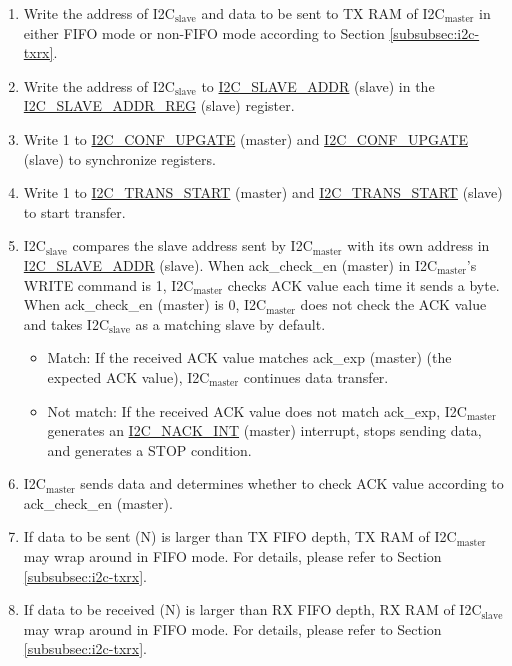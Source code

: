\documentclass[main\_\_EN.tex]{subfiles}
\begin{document}
\begin{enumerate}
\item Write the address of I2C$_\text{slave}$ and data to be sent to TX RAM of I2C$_\text{master}$ in either FIFO mode or non-FIFO mode according to Section \ref{subsubsec:i2c-txrx}.
\item Write the address of I2C$_\text{slave}$ to \hyperref[fielddesc:I2CSLAVEADDR]{I2C\_SLAVE\_ADDR} (slave) in the \hyperref[regdesc:I2CSLAVEADDRREG]{I2C\_SLAVE\_ADDR\_REG} (slave) register.
\item Write 1 to \hyperref[fielddesc:I2CCONFUPGATE]{I2C\_CONF\_UPGATE} (master) and \hyperref[fielddesc:I2CCONFUPGATE]{I2C\_CONF\_UPGATE} (slave) to synchronize registers.
\item Write 1 to \hyperref[fielddesc:I2CTRANSSTART]{I2C\_TRANS\_START} (master) and \hyperref[fielddesc:I2CTRANSSTART]{I2C\_TRANS\_START} (slave) to start transfer.
\item I2C$_\text{slave}$ compares the slave address sent by I2C$_\text{master}$ with its own address in \hyperref[fielddesc:I2CSLAVEADDR]{I2C\_SLAVE\_ADDR} (slave). When ack\_check\_en (master) in I2C$_\text{master}$'s WRITE command is 1, I2C$_\text{master}$ checks ACK value each time it sends a byte. When ack\_check\_en (master) is 0, I2C$_\text{master}$ does not check the ACK value and takes I2C$_\text{slave}$ as a matching slave by default.
\begin{itemize}
\item Match: If the received ACK value matches ack\_exp (master) (the expected ACK value), I2C$_\text{master}$ continues data transfer.
\item Not match: If the received ACK value does not match ack\_exp, I2C$_\text{master}$ generates an \hyperref[int:i2c-nack]{I2C\_NACK\_INT} (master) interrupt, stops sending data, and generates a STOP condition.
\end{itemize}

\item I2C$_\text{master}$ sends data and determines whether to check ACK value according to ack\_check\_en (master).
\item If data to be sent (N) is larger than TX FIFO depth, TX RAM of I2C$_\text{master}$ may wrap around in FIFO mode. For details, please refer to Section \ref{subsubsec:i2c-txrx}. 
\item If data to be received (N) is larger than RX FIFO depth, RX RAM of I2C$_\text{slave}$ may wrap around in FIFO mode. For details, please refer to Section \ref{subsubsec:i2c-txrx}. 


\end{enumerate}
\end{document}
